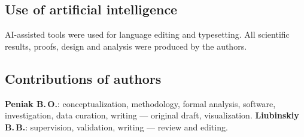 \subsection*{Use of artificial intelligence}
AI-assisted tools were used for language editing and typesetting. All
scientific results, proofs, design and analysis were produced by the authors.

\subsection*{Contributions of authors}
\textbf{Peniak B.\,O.}: conceptualization, methodology, formal analysis,
software, investigation, data curation, writing --- original draft,
visualization.
\textbf{Liubinskiy B.\,B.}: supervision, validation, writing --- review and
editing.
